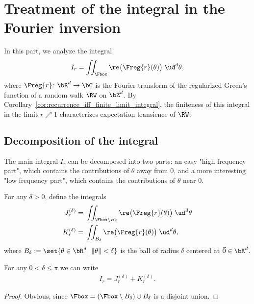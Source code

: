 \chapter{Treatment of the integral in the Fourier inversion}

In this part, we analyze the integral
\begin{align}
I_r = \iint_{\Fbox} \re \big( \Freg{r} (\theta) \big) \; \ud^d \theta ,
\end{align}
where $\Freg{r} \colon \bR^d \to \bC$ is the Fourier transform of the
regularized Green's function of a random walk $\RW$ on $\bZ^d$. By
Corollary~\ref{cor:recurrence_iff_finite_limit_integral}, the finiteness
of this integral in the limit $r \nearrow 1$ characterizes expectation
transience of $\RW$.

\section{Decomposition of the integral}

The main integral $I_r$ can be decomposed into two parts:
an easy "high frequency part", which contains the contributions of
$\theta$ away from $0$, and a more interesting "low frequency part",
which contains the contributions of $\theta$ near $0$.

\begin{definition}[]
  \label{def:frequency_decomposition}
  For any $\delta > 0$, define the integrals
  \begin{align}
  J_r^{(\delta)} = \; & \iint_{\Fbox \setminus B_\delta} \re \big( \Freg{r} (\theta) \big) \; \ud^d \theta \\
  K_r^{(\delta)} = \; & \iint_{B_\delta} \re \big( \Freg{r} (\theta) \big) \; \ud^d \theta ,
  \end{align}
  where $B_\delta := \set{ \theta \in \bR^d \, \big| \, \|\theta\| < \delta}$ is the
  ball of radius $\delta$ centered at $\vec{0} \in \bR^d$.
\end{definition}

\begin{lemma}
  \label{lem:integral_decomposition}
  For any $0 < \delta \le \pi$ we can write
  \begin{align*}
  I_r = J_r^{(\delta)} + K_r^{(\delta)} .
  \end{align*}
\end{lemma}
\begin{proof}
Obvious, since $\Fbox = (\Fbox \setminus B_\delta) \cup B_\delta$
is a disjoint union.
\end{proof}


